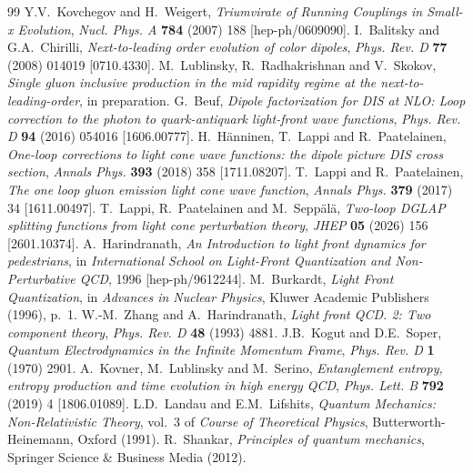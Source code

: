 \documentclass[11pt,a4paper]{article}
\numberwithin{equation}{section}
\begin{document}
\begin{thebibliography}{99}
 Y.V.~Kovchegov and H.~Weigert, \emph{Triumvirate of Running Couplings in Small-x Evolution}, \emph{Nucl. Phys. A} \textbf{784} (2007) 188 [hep-ph/0609090].
 I.~Balitsky and G.A.~Chirilli, \emph{Next-to-leading order evolution of color dipoles}, \emph{Phys. Rev. D} \textbf{77} (2008) 014019 [0710.4330].
 M.~Lublinsky, R.~Radhakrishnan and V.~Skokov, \emph{Single gluon inclusive production in the mid rapidity regime at the next-to-leading-order}, in preparation.
 G.~Beuf, \emph{Dipole factorization for DIS at NLO: Loop correction to the photon to quark-antiquark light-front wave functions}, \emph{Phys. Rev. D} \textbf{94} (2016) 054016 [1606.00777].
 H.~H\"anninen, T.~Lappi and R.~Paatelainen, \emph{One-loop corrections to light cone wave functions: the dipole picture DIS cross section}, \emph{Annals Phys.} \textbf{393} (2018) 358 [1711.08207].
 T.~Lappi and R.~Paatelainen, \emph{The one loop gluon emission light cone wave function}, \emph{Annals Phys.} \textbf{379} (2017) 34 [1611.00497].
 T.~Lappi, R.~Paatelainen and M.~Sepp\"al\"a, \emph{Two-loop DGLAP splitting functions from light cone perturbation theory}, \emph{JHEP} \textbf{05} (2026) 156 [2601.10374].
 A.~Harindranath, \emph{An Introduction to light front dynamics for pedestrians}, in \emph{International School on Light-Front Quantization and Non-Perturbative QCD}, 1996 [hep-ph/9612244].
 M.~Burkardt, \emph{Light Front Quantization}, in \emph{Advances in Nuclear Physics}, Kluwer Academic Publishers (1996), p.~1.
 W.-M.~Zhang and A.~Harindranath, \emph{Light front QCD. 2: Two component theory}, \emph{Phys. Rev. D} \textbf{48} (1993) 4881.
 J.B.~Kogut and D.E.~Soper, \emph{Quantum Electrodynamics in the Infinite Momentum Frame}, \emph{Phys. Rev. D} \textbf{1} (1970) 2901.
 A.~Kovner, M.~Lublinsky and M.~Serino, \emph{Entanglement entropy, entropy production and time evolution in high energy QCD}, \emph{Phys. Lett. B} \textbf{792} (2019) 4 [1806.01089].
 L.D.~Landau and E.M.~Lifshits, \emph{Quantum Mechanics: Non-Relativistic Theory}, vol.~3 of \emph{Course of Theoretical Physics}, Butterworth-Heinemann, Oxford (1991).
 R.~Shankar, \emph{Principles of quantum mechanics}, Springer Science \& Business Media (2012).
\end{thebibliography}
\end{document}
